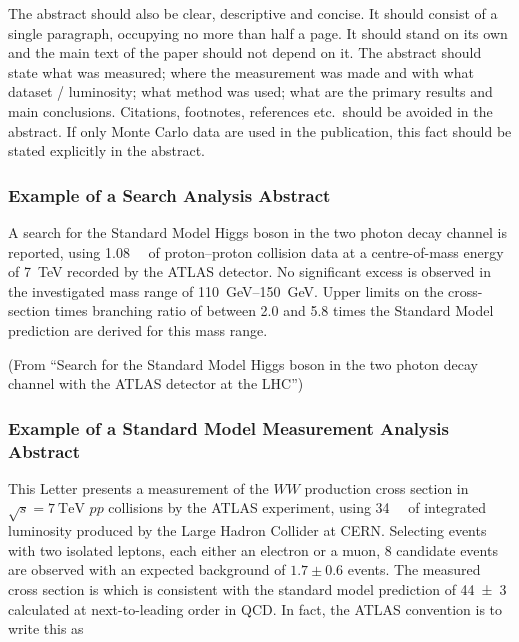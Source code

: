 \documentclass[PAPER,UKenglish,texlive=2016]{\ATLASLATEXPATH atlasdoc}
\begin{document}
The abstract should also be clear, descriptive and concise.
It should consist of a single paragraph, occupying no more than half a page.
It should stand on its own and the main text of the paper should not depend on it.
The abstract should state what was measured; where the measurement was made and with what dataset / luminosity;
what method was used;
what are the primary results and main conclusions.
Citations, footnotes, references etc.\ should be avoided in the abstract.
If only Monte Carlo data are used in the publication, this fact should be stated explicitly in the abstract.


\subsubsection*{Example of a Search Analysis Abstract}

A search for the Standard Model Higgs boson in the two photon decay channel is reported,
using \SI{1.08}{\per\fb} of proton--proton collision data at a centre-of-mass energy of \SI{7}{\TeV} recorded by the ATLAS detector.
No significant excess is observed in the investigated mass range of \SIrange{110}{150}{\GeV}.
Upper limits on the cross-section times branching ratio of between 2.0 and 5.8 times the Standard Model prediction are derived for this mass range.

\noindent(From \enquote{Search for the Standard Model Higgs boson in the two photon decay channel with the ATLAS detector at the LHC})

\subsubsection*{Example of a Standard Model Measurement Analysis Abstract}

This Letter presents a measurement of the $WW$ production cross section in $\sqrt{s} = \SI{7}{\TeV}$ $pp$ collisions by the ATLAS experiment, using \SI{34}{\per\pb} of integrated luminosity produced by the Large Hadron Collider at CERN. Selecting events with two isolated leptons, each either an electron or a muon, 8 candidate events are observed with an expected background of $1.7 \pm 0.6$ events.
The measured cross section is
which is consistent with the standard model prediction of \SI{44(3)}{\pb} calculated at next-to-leading order in QCD.
In fact, the ATLAS convention is to write this as
\end{document}
